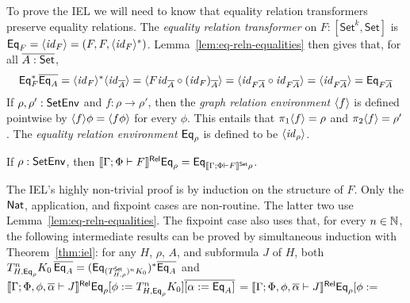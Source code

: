 \documentclass[runningheads]{llncs}
\newcommand{\set}{\mathsf{Set}}
\renewcommand{\id}{\mathit{id}}
\renewcommand{\id}{\mathit{id}}
\begin{document}
To prove the IEL we will need to know that equality relation
transformers preserve equality relations. The {\em equality relation
  transformer} on $F : [\set^k,\set]$ is $\Eq_F = \graph{\id_{F}} =
(F, F, \graph{\id_{F}}^*)$. Lemma~\ref{lem:eq-reln-equalities} then
gives that, for all $\ol{A : \set}$,
\begin{equation*}\label{eq:eq-pres-eq}
\Eq^*_F \ol{\Eq_A}
= \graph{\id_F}^* \graph{\id_{\ol{A}}}
= \graph{F \id_{\ol{A}} \circ (\id_F)_{\ol{A}}}
= \graph{\id_{F\ol{A}} \circ \id_{F\ol{A}}}
= \graph{\id_{F\ol{A}}}
= \Eq_{F\ol{A}}
\end{equation*}
If $\rho, \rho' : \mathsf{SetEnv}$ and $f : \rho \to \rho'$, then
the {\em graph relation environment} $\langle {f} \rangle$ is defined pointwise
by $\langle {f} \rangle \phi = \langle {f \phi} \rangle$ for every $\phi$. This entails
that $\pi_1 \langle {f} \rangle = \rho$ and $\pi_2 \langle {f} \rangle = \rho'$.  The {\em
  equality relation environment} $\mathsf{Eq}_\rho$ is defined to be
$\graph{\id_{\rho}}$.
%
\begin{theorem}[IEL]\label{thm:iel}
    If $\rho : \mathsf{SetEnv}$, then
  $\relsem{\Gamma; \Phi \vdash F} \Eq_\rho = \Eq_{\setsem{\Gamma;
      \Phi \vdash F}\rho}$.
\end{theorem}
The IEL's highly non-trivial proof is by induction on the
structure of $F$. Only the $\mathsf{Nat}$, application, and fixpoint cases are
non-routine. The latter two use
Lemma~\ref{lem:eq-reln-equalities}. The fixpoint case also uses that,
for every $n \in \mathbb{N}$, the following intermediate results can be
proved by simultaneous induction with Theorem~\ref{thm:iel}: for any
$H$, $\rho$, $A$, and subformula $J$ of $H$, both
$T^n_{H,\Eq_{\rho}} K_0\, \ol{\Eq_A}
= (\Eq_{(T^\set_{H,\rho})^n K_0})^*
\ol{\Eq_A}$\;
and 
$ \llbracket{\Gamma; \Phi, \phi, \overline{\alpha} \vdash J}\rrbracket^{\mathsf{Rel}} \mathsf{Eq}_{\rho} [\phi
  := T^{n}_{H,\mathsf{Eq}_{\rho}} K_0] \overline{[\alpha := \mathsf{Eq}_A]}$ $=
\llbracket{\Gamma; \Phi, \phi, \overline{\alpha} \vdash J}\rrbracket^{\mathsf{Rel}} \mathsf{Eq}_{\rho}[\phi :=$
\end{document}
